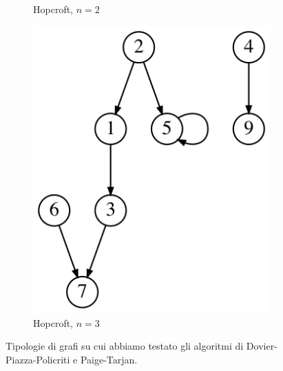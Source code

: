 \begin{figure}[t!]
\begin{subfigure}[b]{0.1\textwidth}
        \caption{Hopcroft, $n=2$}
        \label{fig:hopcroft_graph_1}
    \end{subfigure}
    \qquad \qquad
    \begin{subfigure}[b]{0.2\textwidth}
        \centering
        \includegraphics[width=\textwidth]{./sezione3/experimental_results/plots/hopcroft_graph_2.png}
        \caption{Hopcroft, $n=3$}
        \label{fig:hopcroft_graph_2}
    \end{subfigure}
    \caption{Tipologie di grafi su cui abbiamo testato gli algoritmi di Dovier-Piazza-Policriti e Paige-Tarjan.}
\end{figure}

